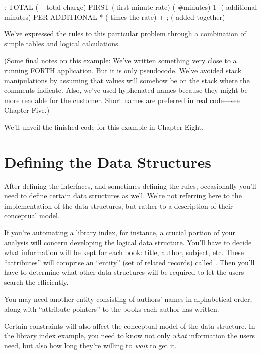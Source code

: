 \begin{Code}
: TOTAL   ( -- total-charge)
   FIRST                        ( first minute rate)
   ( #minutes) 1-               ( additional minutes)
      PER-ADDITIONAL *          ( times the rate)
   +  ;                         ( added together)
\end{Code}
We've expressed the rules to this particular problem through a
combination of simple tables and logical calculations.

(Some final notes on this example: We've written something very close
to a running FORTH application. But it is only pseudocode. We've
avoided stack manipulations by assuming that values will somehow be on
the stack where the comments indicate. Also, we've used hyphenated
names because they might be more readable for the customer. Short
names are preferred in real code---see Chapter Five.)

We'll unveil the finished code for this example in Chapter Eight.

\section{Defining the Data Structures}

After defining the interfaces, and sometimes defining the rules,
occasionally you'll need to define certain data structures as well.
We're not referring here to the implementation of the data structures,
but rather to a description of their conceptual model.

If you're automating a library index, for instance, a crucial portion
of your analysis will concern developing the logical data structure.
You'll have to decide what information will be kept for each book:
title, author, subject, etc. These ``attributes'' will comprise an
``entity'' (set of related records) called . Then you'll
have to determine what other data structures will be required to let
the users search the  efficiently.




You may need another entity consisting of authors' names in
alphabetical order, along with ``attribute pointers'' to the books
each author has written.

Certain constraints will also affect the conceptual model of the data
structure. In the library index example, you need to know not only
\emph{what} information the users need, but also how long they're
willing to \emph{wait} to get it.

